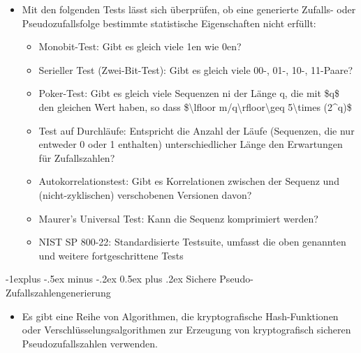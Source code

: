 \documentclass[a4paper]{article}
\makeatletter
\renewcommand{\subsection}{\@startsection{subsection}{2}{0mm}%
 {-1explus -.5ex minus -.2ex}%
 {0.5ex plus .2ex}%
 {\normalfont\normalsize\bfseries}}
\makeatother
\begin{document}
\begin{multicols}{3}
    \begin{itemize}
        \item
              Mit den folgenden Tests lässt sich überprüfen, ob eine generierte
              Zufalls- oder Pseudozufallsfolge bestimmte statistische Eigenschaften
              nicht erfüllt:

              \begin{itemize}
                  \item
                        Monobit-Test: Gibt es gleich viele 1en wie 0en?
                  \item
                        Serieller Test (Zwei-Bit-Test): Gibt es gleich viele 00-, 01-, 10-,
                        11-Paare?
                  \item
                        Poker-Test: Gibt es gleich viele Sequenzen ni der Länge q, die mit
                        \$q\$ den gleichen Wert haben, so dass \$\textbackslash lfloor
                        m/q\textbackslash rfloor\textbackslash geq 5\textbackslash times
                        (2\^{}q)\$
                  \item
                        Test auf Durchläufe: Entspricht die Anzahl der Läufe (Sequenzen, die
                        nur entweder 0 oder 1 enthalten) unterschiedlicher Länge den
                        Erwartungen für Zufallszahlen?
                  \item
                        Autokorrelationstest: Gibt es Korrelationen zwischen der Sequenz und
                        (nicht-zyklischen) verschobenen Versionen davon?
                  \item
                        Maurer's Universal Test: Kann die Sequenz komprimiert werden?
                  \item
                        NIST SP 800-22: Standardisierte Testsuite, umfasst die oben
                        genannten und weitere fortgeschrittene Tests
              \end{itemize}
    \end{itemize}


    \subsection{Sichere
        Pseudo-Zufallszahlengenerierung}

    \begin{itemize}
        \item
              Es gibt eine Reihe von Algorithmen, die kryptografische
              Hash-Funktionen oder Verschlüsselungsalgorithmen zur Erzeugung von
              kryptografisch sicheren Pseudozufallszahlen verwenden.


\end{itemize}
\end{multicols}
\end{document}
